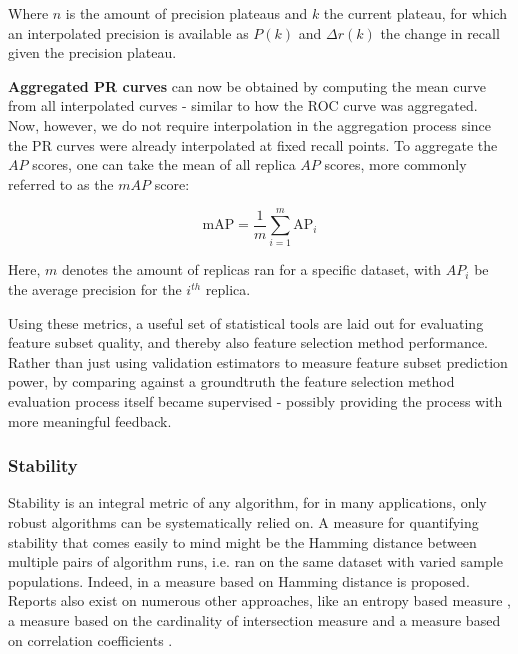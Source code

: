 \documentclass{article}
\begin{document}
Where $n$ is the amount of precision plateaus and $k$ the current plateau, for which an interpolated precision is available as $P(k)$ and $\Delta r(k)$ the change in recall given the precision plateau.

\textbf{Aggregated PR curves} can now be obtained by computing the mean curve from all interpolated curves - similar to how the ROC curve was aggregated. Now, however, we do not require interpolation in the aggregation process since the PR curves were already interpolated at fixed recall points. To aggregate the $AP$ scores, one can take the mean of all replica $AP$ scores, more commonly referred to as the \textbf{$mAP$} score:

\begin{equation}
\mathrm{mAP}=\frac{1}{m} \sum_{i=1}^{m} \mathrm{AP}_{i}
\end{equation}

Here, $m$ denotes the amount of replicas ran for a specific dataset, with $AP_i$ be the average precision for the $i^{th}$ replica.

Using these metrics, a useful set of statistical tools are laid out for evaluating feature subset quality, and thereby also feature selection method performance. Rather than just using validation estimators to measure feature subset prediction power, by comparing against a groundtruth the feature selection method evaluation process itself became supervised - possibly providing the process with more meaningful feedback.

\subsubsection{Stability}\label{sec:evaluation-stability}
Stability is an integral metric of any algorithm, for in many applications, only robust algorithms can be systematically relied on. A measure for quantifying stability that comes easily to mind might be the Hamming distance between multiple pairs of algorithm runs, i.e. ran on the same dataset with varied sample populations. Indeed, in \citep{dunne2002solutions} a measure based on Hamming distance is proposed. Reports also exist on numerous other approaches, like an entropy based measure \citep{kvrivzek2007improving}, a measure based on the cardinality of intersection measure \citep{kuncheva2007stability} and a measure based on correlation coefficients \citep{kalousis2007stability}.
\end{document}
